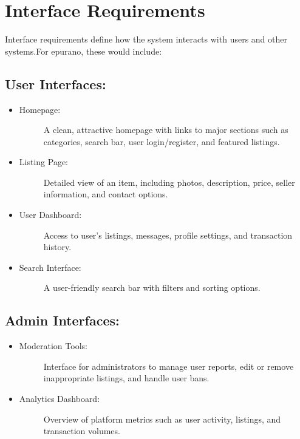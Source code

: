 \section{Interface Requirements}
Interface requirements define how the system interacts with users and other systems.For epurano, these would include:

\subsection{User Interfaces:}
\begin{itemize}
    \item \begin{description}
        \item[Homepage:] A clean, attractive homepage with links to major sections such as categories, search bar, user login/register, and featured listings.
    \end{description}
    \item \begin{description}
        \item[Listing Page:] Detailed view of an item, including photos, description, price, seller information, and contact options.
    \end{description}
    \item \begin{description}
        \item[User Dashboard:] Access to user’s listings, messages, profile settings, and transaction history.
    \end{description}
    \item \begin{description}
        \item[Search Interface:] A user-friendly search bar with filters and sorting options.
    \end{description}
\end{itemize} 

\subsection{Admin Interfaces:}
\begin{itemize}
    \item \begin{description}
        \item[Moderation Tools:] Interface for administrators to manage user reports, edit or remove inappropriate listings, and handle user bans.
    \end{description}
    \item \begin{description}
        \item[Analytics Dashboard:] Overview of platform metrics such as user activity, listings, and transaction volumes.
    \end{description}
\end{itemize} 


